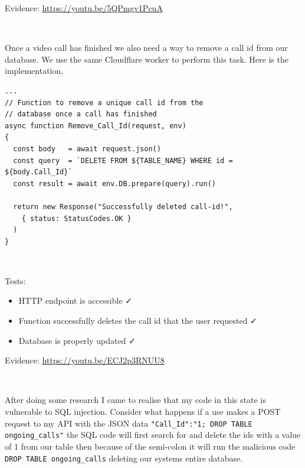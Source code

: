 {\sffamily Evidence:} \url{https://youtu.be/5QPmgv1PcuA}\\ \vspace{0.2cm}

{\color{gray} \hrulefill} \\ \vspace{0.2cm}

Once a video call has finished we also need a way to
remove a call id from our database. We use the same
Cloudflare worker to perform this task. Here is the 
implementation,

\begin{verbatim}
...
// Function to remove a unique call id from the
// database once a call has finished
async function Remove_Call_Id(request, env)
{
  const body   = await request.json()
  const query  = `DELETE FROM ${TABLE_NAME} WHERE id = ${body.Call_Id}`
  const result = await env.DB.prepare(query).run()

  return new Response("Successfully deleted call-id!",
    { status: StatusCodes.OK }
  )
}
\end{verbatim}

{\color{gray} \hrulefill} \\ \vspace{0.2cm}

{\sffamily Tests:}

\begin{itemize}
  \item HTTP endpoint is accessible \faCheck \\
  \item Function successfully deletes the call id that the user requested \faCheck \\
  \item Database is properly updated \faCheck \\
\end{itemize}

{\sffamily Evidence:} \url{https://youtu.be/ECJ2p3RNUU8}\\ \vspace{0.2cm}

{\color{gray} \hrulefill} \\ \vspace{0.2cm}

After doing some research I came to realise that 
my code in this state is vulnerable to SQL injection.
Consider what happens if a use makes a POST request to 
my API with the JSON data
\texttt{{"Call\_Id":"1; DROP TABLE ongoing\_calls"}} the 
SQL code will first search for and delete the ids with a 
value of 1 from our table then because of the semi-colon
it will run the malicious code 
\texttt{DROP TABLE ongoing\_calls} deleting our systems
entire database. \\ \vspace{0.2cm}

